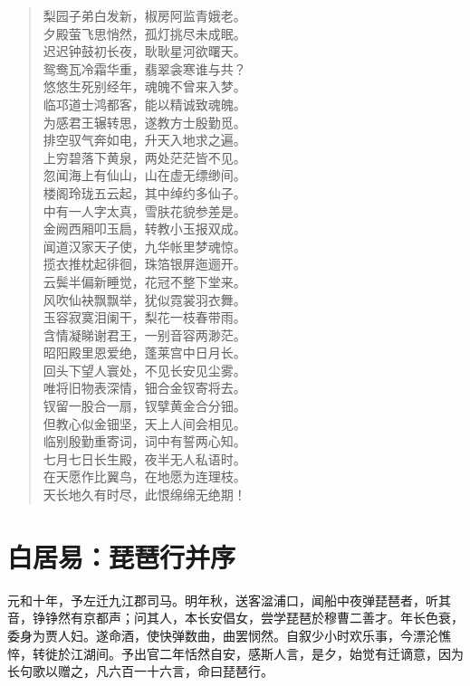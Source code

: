 \documentclass[12pt,oneside]{book}
\newenvironment{shici}{%
\begin{verse}\centering\yanti\large\hspace{12pt}}{\end{verse}}
\begin{document}
\begin{common-format}
\begin{shici}
梨园子弟白发新，椒房阿监青娥老。\\
夕殿萤飞思悄然，孤灯挑尽未成眠。\\
迟迟钟鼓初长夜，耿耿星河欲曙天。\\
鸳鸯瓦冷霜华重，翡翠衾寒谁与共？\\
悠悠生死别经年，魂魄不曾来入梦。\\
临邛道士鸿都客，能以精诚致魂魄。\\
为感君王辗转思，遂教方士殷勤觅。\\
排空驭气奔如电，升天入地求之遍。\\
上穷碧落下黄泉，两处茫茫皆不见。\\
忽闻海上有仙山，山在虚无缥缈间。\\
楼阁玲珑五云起，其中绰约多仙子。\\
中有一人字太真，雪肤花貌参差是。\\
金阙西厢叩玉扃，转教小玉报双成。\\
闻道汉家天子使，九华帐里梦魂惊。\\
揽衣推枕起徘徊，珠箔银屏迤逦开。\\
云鬓半偏新睡觉，花冠不整下堂来。\\
风吹仙袂飘飘举，犹似霓裳羽衣舞。\\
玉容寂寞泪阑干，梨花一枝春带雨。\\
含情凝睇谢君王，一别音容两渺茫。\\
昭阳殿里恩爱绝，蓬莱宫中日月长。\\
回头下望人寰处，不见长安见尘雾。\\
唯将旧物表深情，钿合金钗寄将去。\\
钗留一股合一扇，钗擘黄金合分钿。\\
但教心似金钿坚，天上人间会相见。\\
临别殷勤重寄词，词中有誓两心知。\\
七月七日长生殿，夜半无人私语时。\\
在天愿作比翼鸟，在地愿为连理枝。\\
天长地久有时尽，此恨绵绵无绝期！
\end{shici}

\chapter{白居易：琵琶行并序}
元和十年，予左迁九江郡司马。明年秋，送客湓浦口，闻船中夜弹琵琶者，听其音，铮铮然有京都声；问其人，本长安倡女，尝学琵琶於穆曹二善才。年长色衰，委身为贾人妇。遂命酒，使快弹数曲，曲罢悯然。自叙少小时欢乐事，今漂沦憔悴，转徙於江湖间。予出官二年恬然自安，感斯人言，是夕，始觉有迁谪意，因为长句歌以赠之，凡六百一十六言，命曰琵琶行。


\end{common-format}
\end{document}
